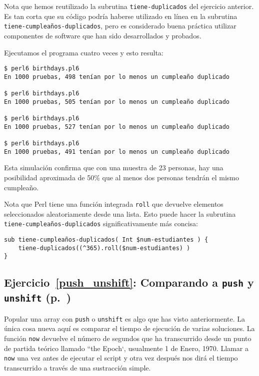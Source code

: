 Nota que hemos reutilizado la subrutina {\tt tiene-duplicados}
del ejercicio anterior. Es tan corta que su código podría
haberse utilizado en línea en la subrutina \verb|tiene-cumpleaños-duplicados|,
pero es considerado buena práctica utilizar componentes
de software que han sido desarrollados y probados.

Ejecutamos el programa cuatro veces y esto resulta:

\begin{verbatim}
$ perl6 birthdays.pl6
En 1000 pruebas, 498 tenían por lo menos un cumpleaño duplicado

$ perl6 birthdays.pl6
En 1000 pruebas, 505 tenían por lo menos un cumpleaño duplicado

$ perl6 birthdays.pl6
En 1000 pruebas, 527 tenían por lo menos un cumpleaño duplicado

$ perl6 birthdays.pl6
En 1000 pruebas, 491 tenían por lo menos un cumpleaño duplicado
\end{verbatim}

Esta simulación confirma que con una muestra de 23 personas,
hay una posibilidad aproximada de 50\% que al menos 
dos personas tendrán el mismo cumpleaño.

Nota que Perl tiene una función integrada {\tt roll}
que devuelve elementos seleccionados aleatoriamente desde
una lista. Esto puede hacer la subrutina {\tt tiene-cumpleaños-duplicados}
significativamente más concisa:

\begin{verbatim}
sub tiene-cumpleaños-duplicados( Int $num-estudiantes ) {
    tiene-duplicados((^365).roll($num-estudiantes) )
}
\end{verbatim}

\subsection{Ejercicio~\ref{push_unshift}: Comparando a {\tt push} y {\tt unshift} (p.~\pageref{push_unshift})}
\label{sol_push_unshift}

Popular una array con {\tt push} o {\tt unshift}
es algo que has visto anteriormente. La única cosa nueva 
aquí es comparar el tiempo de ejecución de varias soluciones.
La función {\tt now} devuelve el número de segundos que 
ha transcurrido desde un punto de partida teórico llamado
``the Epoch`, usualmente 1 de Enero, 1970. Llamar a {\tt now}
una vez antes de ejecutar el script y otra vez después 
nos dirá el tiempo transcurrido a través de una sustracción simple.

